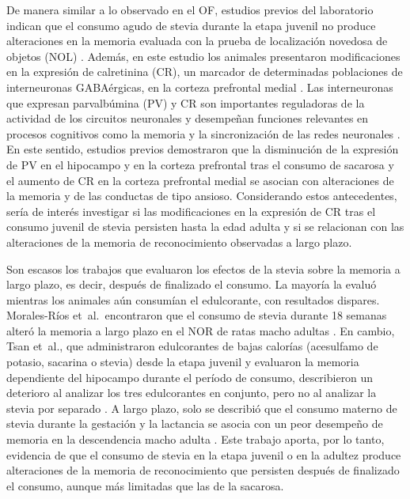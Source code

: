 De manera similar a lo observado en el OF, estudios previos del laboratorio indican que el consumo agudo de stevia durante la etapa juvenil no produce alteraciones en la memoria evaluada con la prueba de localización novedosa de objetos (NOL) \cite{coirini2023stevia,marchena2025stevia}. Además, en este estudio los animales presentaron modificaciones en la expresión de calretinina (CR), un marcador de determinadas poblaciones de interneuronas GABAérgicas, en la corteza prefrontal medial \cite{marchena2025stevia}. Las interneuronas que expresan parvalbúmina (PV) y CR son importantes reguladoras de la actividad de los circuitos neuronales y desempeñan funciones relevantes en procesos cognitivos como la memoria y la sincronización de las redes neuronales \cite{bosch2015amygdala,ognjanovski2017pv}. En este sentido, estudios previos demostraron que la disminución de la expresión de PV en el hipocampo y en la corteza prefrontal tras el consumo de sacarosa \cite{reichelt2015adolescent,xu2018sucrose,reichelt2019hfhs} y el aumento de CR en la corteza prefrontal medial \cite{kruse2019sucrose} se asocian con alteraciones de la memoria y de las conductas de tipo ansioso. Considerando estos antecedentes, sería de interés investigar si las modificaciones en la expresión de CR tras el consumo juvenil de stevia persisten hasta la edad adulta y si se relacionan con las alteraciones de la memoria de reconocimiento observadas a largo plazo.

Son escasos los trabajos que evaluaron los efectos de la stevia sobre la memoria a largo plazo, es decir, después de finalizado el consumo. La mayoría la evaluó mientras los animales aún consumían el edulcorante, con resultados dispares. Morales-Ríos et~al.\ encontraron que el consumo de stevia durante 18 semanas alteró la memoria a largo plazo en el NOR de ratas macho adultas \cite{moralesrios2022sweeteners}. En cambio, Tsan et~al., que administraron edulcorantes de bajas calorías (acesulfamo de potasio, sacarina o stevia) desde la etapa juvenil y evaluaron la memoria dependiente del hipocampo durante el período de consumo, describieron un deterioro al analizar los tres edulcorantes en conjunto, pero no al analizar la stevia por separado \cite{tsan2022lcs}. A largo plazo, solo se describió que el consumo materno de stevia durante la gestación y la lactancia se asocia con un peor desempeño de memoria en la descendencia macho adulta \cite{delagarza2022maternal}. Este trabajo aporta, por lo tanto, evidencia de que el consumo de stevia en la etapa juvenil o en la adultez produce alteraciones de la memoria de reconocimiento que persisten después de finalizado el consumo, aunque más limitadas que las de la sacarosa.

